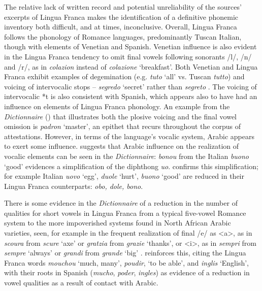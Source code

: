 \documentclass[output=paper]{langsci/langscibook}
\begin{document}
	The relative lack of written record and potential unreliability of the sources’ excerpts of Lingua Franca makes the identification of a definitive phonemic inventory both difficult, and at times, inconclusive. Overall, Lingua Franca follows the phonology of Romance languages, predominantly Tuscan Italian, though with elements of Venetian and Spanish. Venetian influence is also evident in the Lingua Franca tendency to omit final vowels following sonorants /l/, /n/ and /r/, as in \textit{colazion} instead of \textit{colazione} ‘breakfast’. Both Venetian and Lingua Franca exhibit examples of degemination (e.g. \textit{tuto} `all' vs. Tuscan \textit{tutto}) and voicing of intervocalic stops – \textit{segredo} `secret' rather than \textit{segreto} \citep{Ursini2011}. The voicing of intervocalic *t is also consistent with Spanish, which appears also to have had an influence on elements of Lingua Franca phonology. An example from the \textit{Dictionnaire} (\citeyear[63]{Anonymous1830}) that illustrates both the plosive voicing and the final vowel omission is \textit{padron} ‘master’, an epithet that recurs throughout the corpus of attestations. However, in terms of the language’s vocalic system, Arabic appears to exert some influence. \citet{Cifoletti2004} suggests that Arabic influence on the realization of vocalic elements can be seen in the \textit{Dictionnaire}: \textit{bonou} from the Italian \textit{buono} ‘good’ evidences a simplification of the diphthong \textit{uo}. \citet[444]{Bergareche1993} confirms this simplification; for example Italian \textit{uovo} ‘egg’, \textit{duole} ‘hurt’, \textit{buono} ‘good’ are reduced in their Lingua Franca counterparts: \textit{obo, dole, bono}. 
	
	There is some evidence in the \textit{Dictionnaire} of a reduction in the number of qualities for short vowels in Lingua Franca from a typical five-vowel Romance system to the more impoverished systems found in North African Arabic varieties, seen, for example in the frequent realization of final /e/ as <a>, as in \textit{scoura} from \textit{scure} ‘axe’ or \textit{gratzia} from \textit{grazie} ‘thanks’, or <i>, as in \textit{sempri} from \textit{sempre} ‘always’ or \textit{grandi} from \textit{grande} ‘big’ . \citet[444]{Bergareche1993} reinforces this, citing the Lingua Franca words \textit{mouchou} ‘much, many’, \textit{poudir}, ‘to be able’, and \textit{inglis} ‘English’, with their roots in Spanish (\textit{mucho}, \textit{poder}, \textit{ingles}) as evidence of a reduction in vowel qualities as a result of contact with Arabic. 
	
\end{document}
